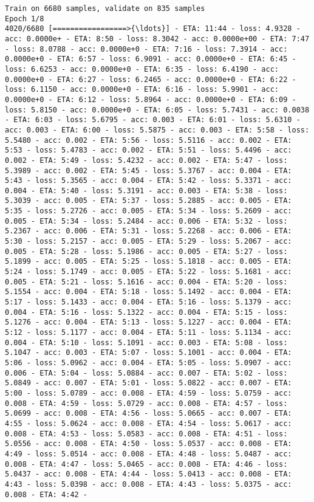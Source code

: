 \documentclass[11pt]{article}
\begin{document}
    \begin{Verbatim}[commandchars=\\\{\}]
Train on 6680 samples, validate on 835 samples
Epoch 1/8
4020/6680 [=================>{\ldots}] - ETA: 11:44 - loss: 4.9328 - acc: 0.0000e+ - ETA: 8:50 - loss: 8.3042 - acc: 0.0000e+00 - ETA: 7:47 - loss: 8.0788 - acc: 0.0000e+0 - ETA: 7:16 - loss: 7.3914 - acc: 0.0000e+0 - ETA: 6:57 - loss: 6.9091 - acc: 0.0000e+0 - ETA: 6:45 - loss: 6.6253 - acc: 0.0000e+0 - ETA: 6:35 - loss: 6.4190 - acc: 0.0000e+0 - ETA: 6:27 - loss: 6.2465 - acc: 0.0000e+0 - ETA: 6:22 - loss: 6.1150 - acc: 0.0000e+0 - ETA: 6:16 - loss: 5.9901 - acc: 0.0000e+0 - ETA: 6:12 - loss: 5.8964 - acc: 0.0000e+0 - ETA: 6:09 - loss: 5.8150 - acc: 0.0000e+0 - ETA: 6:05 - loss: 5.7431 - acc: 0.0038    - ETA: 6:03 - loss: 5.6795 - acc: 0.003 - ETA: 6:01 - loss: 5.6310 - acc: 0.003 - ETA: 6:00 - loss: 5.5875 - acc: 0.003 - ETA: 5:58 - loss: 5.5480 - acc: 0.002 - ETA: 5:56 - loss: 5.5116 - acc: 0.002 - ETA: 5:53 - loss: 5.4783 - acc: 0.002 - ETA: 5:51 - loss: 5.4496 - acc: 0.002 - ETA: 5:49 - loss: 5.4232 - acc: 0.002 - ETA: 5:47 - loss: 5.3989 - acc: 0.002 - ETA: 5:45 - loss: 5.3767 - acc: 0.004 - ETA: 5:43 - loss: 5.3565 - acc: 0.004 - ETA: 5:42 - loss: 5.3371 - acc: 0.004 - ETA: 5:40 - loss: 5.3191 - acc: 0.003 - ETA: 5:38 - loss: 5.3039 - acc: 0.005 - ETA: 5:37 - loss: 5.2885 - acc: 0.005 - ETA: 5:35 - loss: 5.2726 - acc: 0.005 - ETA: 5:34 - loss: 5.2609 - acc: 0.005 - ETA: 5:34 - loss: 5.2484 - acc: 0.006 - ETA: 5:32 - loss: 5.2367 - acc: 0.006 - ETA: 5:31 - loss: 5.2268 - acc: 0.006 - ETA: 5:30 - loss: 5.2157 - acc: 0.005 - ETA: 5:29 - loss: 5.2067 - acc: 0.005 - ETA: 5:28 - loss: 5.1986 - acc: 0.005 - ETA: 5:27 - loss: 5.1899 - acc: 0.005 - ETA: 5:25 - loss: 5.1818 - acc: 0.005 - ETA: 5:24 - loss: 5.1749 - acc: 0.005 - ETA: 5:22 - loss: 5.1681 - acc: 0.005 - ETA: 5:21 - loss: 5.1616 - acc: 0.004 - ETA: 5:20 - loss: 5.1554 - acc: 0.004 - ETA: 5:18 - loss: 5.1492 - acc: 0.004 - ETA: 5:17 - loss: 5.1433 - acc: 0.004 - ETA: 5:16 - loss: 5.1379 - acc: 0.004 - ETA: 5:16 - loss: 5.1322 - acc: 0.004 - ETA: 5:15 - loss: 5.1276 - acc: 0.004 - ETA: 5:13 - loss: 5.1227 - acc: 0.004 - ETA: 5:12 - loss: 5.1177 - acc: 0.004 - ETA: 5:11 - loss: 5.1134 - acc: 0.004 - ETA: 5:10 - loss: 5.1091 - acc: 0.003 - ETA: 5:08 - loss: 5.1047 - acc: 0.003 - ETA: 5:07 - loss: 5.1001 - acc: 0.004 - ETA: 5:06 - loss: 5.0962 - acc: 0.004 - ETA: 5:05 - loss: 5.0907 - acc: 0.006 - ETA: 5:04 - loss: 5.0884 - acc: 0.007 - ETA: 5:02 - loss: 5.0849 - acc: 0.007 - ETA: 5:01 - loss: 5.0822 - acc: 0.007 - ETA: 5:00 - loss: 5.0789 - acc: 0.008 - ETA: 4:59 - loss: 5.0759 - acc: 0.008 - ETA: 4:59 - loss: 5.0729 - acc: 0.008 - ETA: 4:57 - loss: 5.0699 - acc: 0.008 - ETA: 4:56 - loss: 5.0665 - acc: 0.007 - ETA: 4:55 - loss: 5.0624 - acc: 0.008 - ETA: 4:54 - loss: 5.0617 - acc: 0.008 - ETA: 4:53 - loss: 5.0583 - acc: 0.008 - ETA: 4:51 - loss: 5.0556 - acc: 0.008 - ETA: 4:50 - loss: 5.0537 - acc: 0.008 - ETA: 4:49 - loss: 5.0514 - acc: 0.008 - ETA: 4:48 - loss: 5.0487 - acc: 0.008 - ETA: 4:47 - loss: 5.0465 - acc: 0.008 - ETA: 4:46 - loss: 5.0437 - acc: 0.008 - ETA: 4:44 - loss: 5.0413 - acc: 0.008 - ETA: 4:43 - loss: 5.0398 - acc: 0.008 - ETA: 4:43 - loss: 5.0375 - acc: 0.008 - ETA: 4:42 - 
\end{Verbatim}
\end{document}

